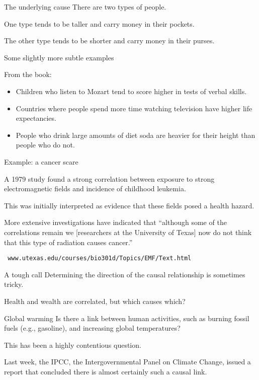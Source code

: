 \documentclass{beamer}
\begin{document}
\begin{frame}{The underlying cause}
There are two types of people.

\pause
\vfill
One type tends to be taller and carry money in their
pockets.

\pause
\vfill
The other type tends to be shorter and carry money in
their purses.
\end{frame}


\begin{frame}{Some slightly  more subtle examples}

From the book:

\begin{itemize}
\item
Children who listen to Mozart tend to score higher
in tests of verbal skills.

\item
Countries where people spend more time watching
television have higher life expectancies.

\item
People who drink large amounts of diet soda
are heavier for their height than people who 
do not.
\end{itemize}
\end{frame}

\begin{frame}{Example:  a cancer scare}

A 1979 study found a strong correlation between 
exposure to strong electromagnetic fields and 
incidence of childhood leukemia.

\vfill
This was initially interpreted as evidence that
these fields posed a health hazard.

\vfill
More extensive investigations have indicated
that ``although some of the correlations remain
we [researchers at the University of Texas] now 
do not think that this type of radiation causes 
cancer.''

\vfill
{\tt \normalsize
www.utexas.edu/courses/bio301d/Topics/EMF/Text.html
}
\end{frame}

\begin{frame}{A tough call}
Determining the direction of the causal relationship
is sometimes tricky.

\vfill
Health and wealth are correlated, but which causes which?
\end{frame}

\begin{frame}{Global warming}
Is there a link between human activities, such as burning
fossil fuels (e.g., gasoline), and increasing global temperatures?

\vfill
This has been a highly contentious question.

\vfill
Last week, the IPCC, the Intergovernmental Panel on Climate
Change, issued a report that concluded there is almost certainly
such a causal link.

\end{frame}
\end{document}
